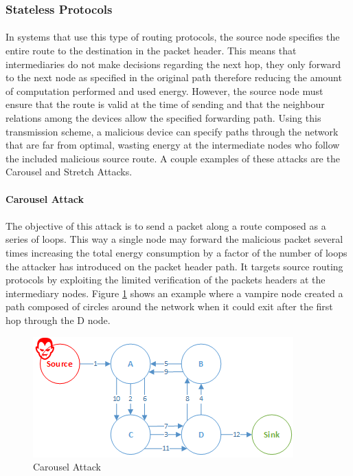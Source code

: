 \subsubsection{Stateless Protocols}
\label{sec:source_routing}
\paragraph{}
In systems that use this type of routing protocols, the source node specifies the entire route to the destination in the packet header. This means that intermediaries do not make decisions regarding the next hop, they only forward to the next node as specified in the original path therefore reducing the amount of computation performed and used energy. However, the source node must ensure that the route is valid at the time of sending and that the neighbour relations among the devices allow the specified forwarding path. Using this transmission scheme, a malicious device can specify paths through the network that are far from optimal, wasting energy at the intermediate nodes who follow the included malicious source route. A couple examples of these attacks are the Carousel and Stretch Attacks.

\paragraph{\textbf{Carousel Attack}}
\paragraph{}
The objective of this attack is to send a packet along a route composed as a series of loops. This way a single node may forward the malicious packet several times increasing the total energy consumption by a factor of the number of loops the attacker has introduced on the packet header path. It targets source routing protocols by exploiting the limited verification of the packets headers at the intermediary nodes. Figure \ref{fig:carousel_attack} shows an example where a vampire node created a path composed of circles around the network when it could exit after the first hop through the D node.
 
\begin{figure}[h]
  \centering
  \includegraphics[width=0.8\linewidth]{figures/Carousel_Attack.png}
  \caption{Carousel Attack}
  \label{fig:carousel_attack}
\end{figure}

